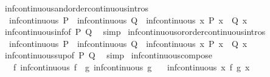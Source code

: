 \begin{isabellebody}
\isanewline
{}\isamarkupfalse%
%
\endisatagproof
{\isafoldproof}%
%
\isadelimproof
\isanewline
%
\endisadelimproof
\isanewline
{}\isamarkupfalse%
\ inf{\isacharunderscore}continuous{\isacharunderscore}and{\isacharbrackleft}order{\isacharunderscore}continuous{\isacharunderscore}intros{\isacharbrackright}{\isacharcolon}\isanewline
\ \ {\isachardoublequoteopen}inf{\isacharunderscore}continuous\ P\ {\isasymLongrightarrow}\ inf{\isacharunderscore}continuous\ Q\ {\isasymLongrightarrow}\ inf{\isacharunderscore}continuous\ {\isacharparenleft}{\isasymlambda}x{\isachardot}\ P\ x\ {\isasymand}\ Q\ x{\isacharparenright}{\isachardoublequoteclose}\isanewline
%
\isadelimproof
\ \ %
\endisadelimproof
%
\isatagproof
{}\isamarkupfalse%
\ inf{\isacharunderscore}continuous{\isacharunderscore}inf{\isacharbrackleft}of\ P\ Q{\isacharbrackright}\ \isamarkupfalse%
\ simp%
\endisatagproof
{\isafoldproof}%
%
\isadelimproof
\isanewline
%
\endisadelimproof
\isanewline
{}\isamarkupfalse%
\ inf{\isacharunderscore}continuous{\isacharunderscore}or{\isacharbrackleft}order{\isacharunderscore}continuous{\isacharunderscore}intros{\isacharbrackright}{\isacharcolon}\isanewline
\ \ {\isachardoublequoteopen}inf{\isacharunderscore}continuous\ P\ {\isasymLongrightarrow}\ inf{\isacharunderscore}continuous\ Q\ {\isasymLongrightarrow}\ inf{\isacharunderscore}continuous\ {\isacharparenleft}{\isasymlambda}x{\isachardot}\ P\ x\ {\isasymor}\ Q\ x{\isacharparenright}{\isachardoublequoteclose}\isanewline
%
\isadelimproof
\ \ %
\endisadelimproof
%
\isatagproof
{}\isamarkupfalse%
\ inf{\isacharunderscore}continuous{\isacharunderscore}sup{\isacharbrackleft}of\ P\ Q{\isacharbrackright}\ \isamarkupfalse%
\ simp%
\endisatagproof
{\isafoldproof}%
%
\isadelimproof
\isanewline
%
\endisadelimproof
\isanewline
{}\isamarkupfalse%
\ inf{\isacharunderscore}continuous{\isacharunderscore}compose{\isacharcolon}\isanewline
\ \ \ f{\isacharcolon}\ {\isachardoublequoteopen}inf{\isacharunderscore}continuous\ f{\isachardoublequoteclose}\ \ g{\isacharcolon}\ {\isachardoublequoteopen}inf{\isacharunderscore}continuous\ g{\isachardoublequoteclose}\isanewline
\ \ \ {\isachardoublequoteopen}inf{\isacharunderscore}continuous\ {\isacharparenleft}{\isasymlambda}x{\isachardot}\ f\ {\isacharparenleft}g\ x{\isacharparenright}{\isacharparenright}{\isachardoublequoteclose}\isanewline
%
\isadelimproof
\ \ %
\endisadelimproof
%
\isatagproof
{}\isamarkupfalse%

\end{isabellebody}
